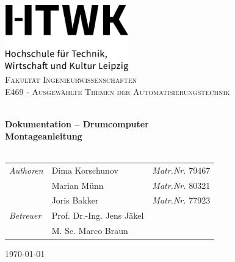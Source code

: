 
\begin{titlepage}
\vbox{ }
\vbox{ }
\begin{center}

\includegraphics[width=0.40\textwidth,center]{Images/HTWK_Zusatz_de_V_Black.jpg}\\[1cm]

\textsc{\LARGE Fakultät Ingenieurwissenschaften}\\[1.5cm]
\textsc{\Large  E469  - Ausgewählte Themen der Automatisierungstechnik}\\[0.5cm]
\vbox{ }

\HRule \\[0.4cm]
{ \huge \bfseries Dokumentation – Drumcomputer\\Montageanleitung}\\[0.4cm]
\HRule \\[1.5cm]

\begin{table}[h]
\large
    \centering
    \begin{tabular}{lll}
        \emph{Authoren} & Dima Korschunov & \emph{Matr.Nr.} 79467 \\
                    & Marian Münn & \emph{Matr.Nr.} 80321 \\
                    & Joris Bakker & \emph{Matr.Nr.} 77923 \\
         \emph{Betreuer} & Prof. Dr.-Ing. Jens Jäkel &\\
                         & M. Sc. Marco Braun
    \end{tabular}
\end{table}

\vfill
{\large \today}
\end{center}
\end{titlepage}